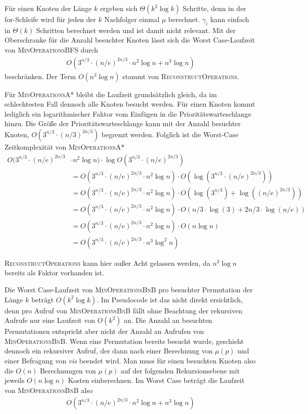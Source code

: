 \documentclass[a4paper, 10pt, ngerman]{article}
\begin{document}
Für einen Knoten der Länge $k$ ergeben sich $\Theta(k^2 \log k)$ Schritte, denn in der for-Schleife wird für jeden der $k$ Nachfolger einmal $\mu$ berechnet. $\gamma_i$ kann einfach in $\Theta(k)$ Schritten berechnet werden und ist damit nicht relevant. Mit der Oberschranke für die Anzahl besuchter Knoten lässt sich die Worst Case-Laufzeit von \textsc{MinOperationsBFS} durch
\begin{align*}
    O(3^{n/3} \cdot (n/e)^{2n/3} \cdot n^2 \log n + n^3 \log n)
\end{align*}
beschränken. Der Term $O(n^3 \log n)$ stammt von \textsc{ReconstructOperations}.

Für \textsc{MinOperationsA*} bleibt die Laufzeit grundsätzlich gleich, da im schlechtesten Fall dennoch alle Knoten besucht werden. Für einen Knoten kommt lediglich ein logarithmischer Faktor vom Einfügen in die Prioritätswarteschlange hinzu. Die Größe der Prioritätswarteschlange kann mit der Anzahl besuchter Knoten, $O(3^{n/3} \cdot (n/3)^{2n/3})$ begrenzt werden. Folglich ist die Worst-Case Zeitkomplexität von \textsc{MinOperationsA*} 
\begin{align*}
    O(3^{n/3} \cdot (n/e)^{2n/3} & \cdot n^2 \log n) \cdot \log O(3^{n/3} \cdot (n/e)^{2n/3}) \\
     & = O(3^{n/3} \cdot (n/e)^{2n/3} \cdot n^2 \log n) \cdot 
     O(\log (3^{n/3} \cdot (n/e)^{2n/3})) \\
     & = O(3^{n/3} \cdot (n/e)^{2n/3} \cdot n^2 \log n) \cdot O(\log (3^{n/3}) + \log((n/e)^{2n/3})) \\
     & = O(3^{n/3} \cdot (n/e)^{2n/3} \cdot n^2 \log n) \cdot O(n/3 \cdot \log (3) + 2n/3 \cdot \log(n/e)) \\
     & = O(3^{n/3} \cdot (n/e)^{2n/3} \cdot n^2 \log n) \cdot O(n \log n) \\
     & = O(3^{n/3} \cdot (n/e)^{2n/3} \cdot n^3 \log^2 n)
\end{align*}

\textsc{ReconstructOperations} kann hier außer Acht gelassen werden, da $n^3 \log n$ bereits als Faktor vorhanden ist.

Die Worst Case-Laufzeit von \textsc{MinOperationsBnB} pro besuchter Permutation der Länge $k$ beträgt $O(k^2 \log k)$. Im Pseudocode ist das nicht direkt ersichtlich, denn pro Aufruf von \textsc{MinOperationsBnB} fällt ohne Beachtung der rekursiven Aufrufe nur eine Laufzeit von $O(k^2)$ an. Die Anzahl an besuchten Permutationen entspricht aber nicht der Anzahl an Aufrufen von \textsc{MinOperationsBnB}. Wenn eine Permutation bereits besucht wurde, geschieht dennoch ein rekursiver Aufruf, der dann nach einer Berechnung von $\mu(p)$ und einer Befragung von \emph{vis} beendet wird. Man muss für einen besuchten Knoten also die $O(n)$ Berechnungen von $\mu(p)$ auf der folgenden Rekursionsebene mit jeweils $O(n \log n)$ Kosten einberechnen. Im Worst Case beträgt die Laufzeit von \textsc{MinOperationsBnB} also
\begin{align*}
    O(3^{n/3} \cdot (n/e)^{2n/3} \cdot n^2 \log n + n^3 \log n)
\end{align*}
\end{document}
